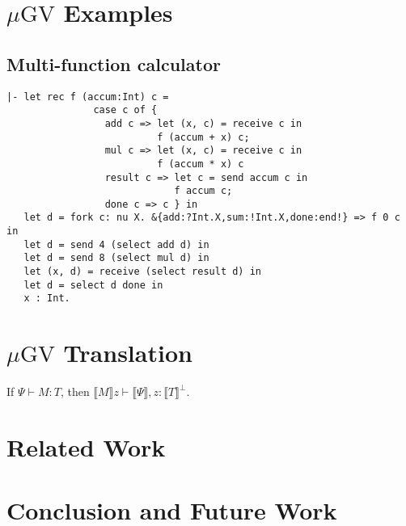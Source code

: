 \documentclass[orivec,envcountsame]{llncs}
\newcommand{\cpdual}[1]{#1^\perp}
\newcommand{\cptyp}[2]{#1 \vdash #2}
\newcommand{\gvtyp}[3]{#1 \vdash #2 : #3}
\newcommand{\tocp}[1]{\llbracket #1 \rrbracket}
\newcommand{\mugv}{$\mu\mathrm{GV}$}
\begin{document}
\section{\mugv{} Examples}

\subsection{Multi-function calculator}

\begin{verbatim}
|- let rec f (accum:Int) c =
               case c of {
                 add c => let (x, c) = receive c in
                          f (accum + x) c;
                 mul c => let (x, c) = receive c in
                          f (accum * x) c
                 result c => let c = send accum c in
                             f accum c;
                 done c => c } in
   let d = fork c: nu X. &{add:?Int.X,sum:!Int.X,done:end!} => f 0 c in
   let d = send 4 (select add d) in
   let d = send 8 (select mul d) in
   let (x, d) = receive (select result d) in
   let d = select d done in
   x : Int.
\end{verbatim}

\section{\mugv{} Translation}

\begin{theorem}
  If $\gvtyp{\Psi}{M}{T}$, then $\cptyp{\tocp{M}z}{\tocp{\Psi},z:\cpdual{\tocp{T}}}$.
\end{theorem}

\section{Related Work}

\section{Conclusion and Future Work}
\end{document}
